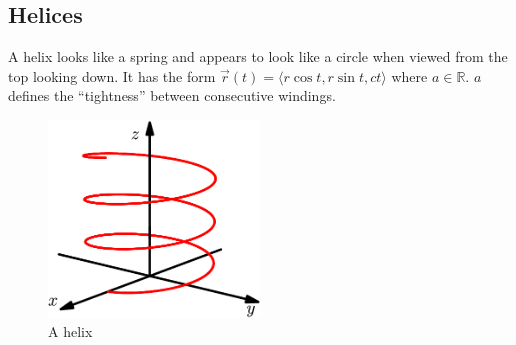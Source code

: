 \subsection{Helices}
\noindent
A helix looks like a spring and appears to look like a circle when viewed from the top looking down.
It has the form $\vec{r}(t) = \langle r\cos{t}, r\sin{t}, ct\rangle$ where $a\in\mathbb{R}$. $a$ defines the ``tightness'' between consecutive windings.

\begin{figure}[H]
	\centering
	\includegraphics[width=0.5\textwidth]{./vectorValuedFunctions/Helix.png}
	\caption{A helix}
\end{figure}